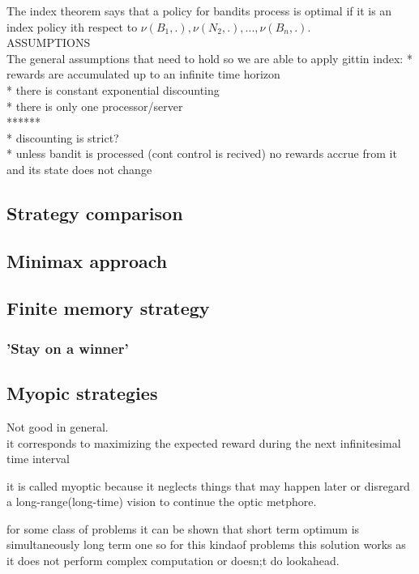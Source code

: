 \documentclass[12pt, a4paper, pdflatex, leqno]{report}
\begin{document}
The index theorem says that a policy for bandits process is optimal if it is an index policy ith respect to $\nu(B_1, .), \nu(N_2, .), ... , \nu(B_n, .)$.\\


ASSUMPTIONS\\
The general assumptions that need to hold so we are able to apply gittin index:
* rewards are accumulated up to an infinite time horizon\\
* there is constant exponential discounting\\
* there is only one processor/server\\
******\\
* discounting is strict?\\
* unless bandit is processed (cont control is recived) no rewards accrue from it and its state does not change\\


\subsection{Strategy comparison}

\subsection{Minimax approach}

\subsection{Finite memory strategy}
\subsubsection{'Stay on a winner'}

\subsection{Myopic strategies}
Not good in general.\\

it corresponds to maximizing the expected reward during the next infinitesimal time interval

it is called myoptic because it neglects things that may happen later or disregard a long-range(long-time) vision to continue the optic metphore.

for some class of problems it can be shown that short term optimum is simultaneously long term one so for this kindaof problems this solution works as it does not perform complex computation or doesn;t do lookahead.
\end{document}
